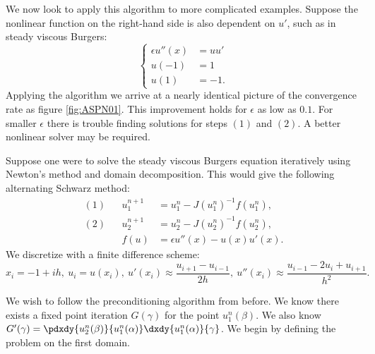 \documentclass{book}
\begin{document}
We now look to apply this algorithm to more complicated examples.
Suppose the nonlinear function on the right-hand side is also dependent on $u'$, such as in steady viscous Burgers:
\begin{equation*}
\begin{cases} \epsilon u''(x) & = u u' \\
u(-1) & = 1 \\
u(1) & = -1 . \end{cases}
\end{equation*}
Applying the algorithm we arrive at a nearly identical picture of the convergence rate as figure \ref{fig:ASPN01}.
This improvement holds for $\epsilon$ as low as $0.1$.
For smaller $\epsilon$ there is trouble finding solutions for steps $(1)$ and $(2)$.
A better nonlinear solver may be required.

Suppose one were to solve the steady viscous Burgers equation iteratively using Newton's method and domain decomposition.
This would give the following alternating Schwarz method:
\begin{align*}
(1) && u^{n+1}_1 & = u^n_1 - J(u^n_1)^{-1} f(u^n_1) , \\
(2) && u^{n+1}_2 & = u^n_2 - J(u^n_2)^{-1} f(u^n_2) , \\
&& f(u) & = \epsilon u''(x) - u(x) u'(x) .
\end{align*}
We discretize with a finite difference scheme:
\begin{equation*}
x_i = -1 + ih, \ u_i = u(x_i), \ u'(x_i) \approx \frac{u_{i+1} - u_{i-1}}{2h}, \ u''(x_i) \approx \frac{u_{i-1} - 2u_i + u_{i+1}}{h^2} .
\end{equation*}

We wish to follow the preconditioning algorithm from before.
We know there exists a fixed point iteration $G(\gamma)$ for the point $u^n_1(\beta)$.
We also know $G'(\gamma) = \pdxdy{u^n_2(\beta)}{u^n_1(\alpha)} \dxdy{u^n_1(\alpha)}{\gamma}$.
We begin by defining the problem on the first domain.
\end{document}
